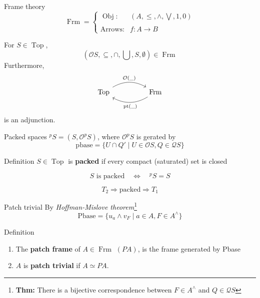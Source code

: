 \documentclass[compress,12pt]{beamer}
\DeclareMathOperator{\pt}{pt}
\DeclareMathOperator{\Frm}{Frm}
\DeclareMathOperator{\Top}{Top}
\DeclareMathOperator{\Obj}{Obj}
\begin{document}
\begin{frame}[fragile]{Frame theory}
\[
\Frm= \left\{ \begin{array}{lc} \Obj: & (A, \leq, \wedge, \bigvee, 1, 0) \\ \\ \mbox{Arrows:} & f\colon A\to B  \end{array} \right.
\]

For $S\in \Top$,
\[
(\mathcal{O}S, \subseteq, \cap, \bigcup, S, \emptyset)\in \Frm
\]
Furthermore,
\[
\begin{tikzcd}
\Top \arrow[rr, "\mathcal{O}(\_)", bend left] &  & \Frm \arrow[ll, "\pt(\_)", bend left]
\end{tikzcd}
\]
is an adjunction.
\end{frame}

\begin{frame}{Packed spaces}
    $^pS=(S, \mathcal{O}^pS)$, where $\mathcal{O}^pS$ is gerated by
    \[
    \mbox{pbase}=\{U\cap Q'\mid U\in \mathcal{O}S, Q\in \mathcal{Q}S\}
    \]
\begin{block}{Definition}
$S\in \Top$ is \textbf{packed} if every compact (saturated) set is closed
\end{block}
\[
S \mbox{ is packed}\quad\iff\quad ^pS=S
\]

\[
T_2\Rightarrow \mbox{packed}\Rightarrow T_1
\]
\end{frame}

\begin{frame}{Patch trivial}
By \emph{Hoffman-Mislove theorem}\footnote{\textbf{Thm:} There is a bijective correspondence between $F\in A^\wedge$ and $Q\in \mathcal{Q}S$}
\[
\mbox{Pbase}=\{u_a\wedge v_F\mid a\in A, F\in A^\wedge\}
\]
\begin{block}{Definition}
\begin{enumerate}
    \item The \textbf{patch frame} of $A\in \Frm$ $(PA)$, is the frame generated by Pbase
    \item $A$ is \textbf{patch trivial} if $A\simeq PA$.
\end{enumerate}
\end{block}

\end{frame}
\end{document}

